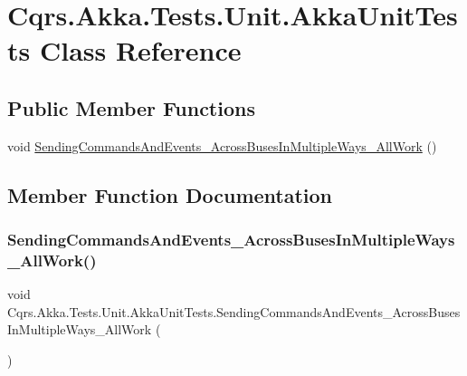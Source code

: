 \hypertarget{classCqrs_1_1Akka_1_1Tests_1_1Unit_1_1AkkaUnitTests}{}\section{Cqrs.\+Akka.\+Tests.\+Unit.\+Akka\+Unit\+Tests Class Reference}
\label{classCqrs_1_1Akka_1_1Tests_1_1Unit_1_1AkkaUnitTests}
\subsection*{Public Member Functions}
\begin{DoxyCompactItemize}
\item 
void \hyperlink{classCqrs_1_1Akka_1_1Tests_1_1Unit_1_1AkkaUnitTests_a52e29eb0469798255ae67613e2f4645b}{Sending\+Commands\+And\+Events\+\_\+\+Across\+Buses\+In\+Multiple\+Ways\+\_\+\+All\+Work} ()
\end{DoxyCompactItemize}


\subsection{Member Function Documentation}
\mbox{\label{classCqrs_1_1Akka_1_1Tests_1_1Unit_1_1AkkaUnitTests_a52e29eb0469798255ae67613e2f4645b}} 
\subsubsection{\texorpdfstring{Sending\+Commands\+And\+Events\+\_\+\+Across\+Buses\+In\+Multiple\+Ways\+\_\+\+All\+Work()}{SendingCommandsAndEvents\_AcrossBusesInMultipleWays\_AllWork()}}
{\footnotesize\ttfamily void Cqrs.\+Akka.\+Tests.\+Unit.\+Akka\+Unit\+Tests.\+Sending\+Commands\+And\+Events\+\_\+\+Across\+Buses\+In\+Multiple\+Ways\+\_\+\+All\+Work (\begin{DoxyParamCaption}{ }\end{DoxyParamCaption})}


